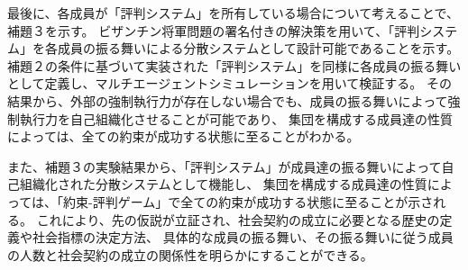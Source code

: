 最後に、各成員が「評判システム」を所有している場合について考えることで、補題３を示す。
ビザンチン将軍問題の署名付きの解決策を用いて、「評判システム」を各成員の振る舞いによる分散システムとして設計可能であることを示す。
補題２の条件に基づいて実装された「評判システム」を同様に各成員の振る舞いとして定義し、マルチエージェントシミュレーションを用いて検証する。
その結果から、外部の強制執行力が存在しない場合でも、成員の振る舞いによって強制執行力を自己組織化させることが可能であり、
集団を構成する成員達の性質によっては、全ての約束が成功する状態に至ることがわかる。

また、補題３の実験結果から、「評判システム」が成員達の振る舞いによって自己組織化された分散システムとして機能し、
集団を構成する成員達の性質によっては、「約束-評判ゲーム」で全ての約束が成功する状態に至ることが示される。
これにより、先の仮説が立証され、社会契約の成立に必要となる歴史の定義や社会指標の決定方法、
具体的な成員の振る舞い、その振る舞いに従う成員の人数と社会契約の成立の関係性を明らかにすることができる。
